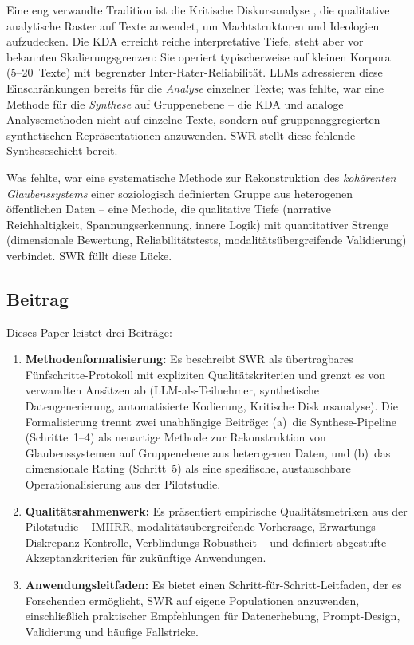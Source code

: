 \documentclass[11pt,a4paper]{article}
\begin{document}
Eine eng verwandte Tradition ist die Kritische Diskursanalyse \citep[KDA;][]{Fairclough1992, Wodak2001}, die qualitative analytische Raster auf Texte anwendet, um Machtstrukturen und Ideologien aufzudecken. Die KDA erreicht reiche interpretative Tiefe, steht aber vor bekannten Skalierungsgrenzen: Sie operiert typischerweise auf kleinen Korpora (5--20~Texte) mit begrenzter Inter-Rater-Reliabilit\"at. LLMs adressieren diese Einschr\"ankungen bereits f\"ur die \emph{Analyse} einzelner Texte; was fehlte, war eine Methode f\"ur die \emph{Synthese} auf Gruppenebene -- die KDA und analoge Analysemethoden nicht auf einzelne Texte, sondern auf gruppenaggregierten synthetischen Repr\"asentationen anzuwenden. SWR stellt diese fehlende Syntheseschicht bereit.

Was fehlte, war eine systematische Methode zur Rekonstruktion des \emph{koh\"arenten Glaubenssystems} einer soziologisch definierten Gruppe aus heterogenen \"offentlichen Daten -- eine Methode, die qualitative Tiefe (narrative Reichhaltigkeit, Spannungserkennung, innere Logik) mit quantitativer Strenge (dimensionale Bewertung, Reliabilit\"atstests, modalit\"ats\"ubergreifende Validierung) verbindet. SWR f\"ullt diese L\"ucke.


\subsection{Beitrag}
\label{sec:intro:contribution}

Dieses Paper leistet drei Beitr\"age:

\begin{enumerate}[nosep]
  \item \textbf{Methodenformalisierung:} Es beschreibt SWR als \"ubertragbares F\"unfschritte-Protokoll mit expliziten Qualit\"atskriterien und grenzt es von verwandten Ans\"atzen ab (LLM-als-Teilnehmer, synthetische Datengenerierung, automatisierte Kodierung, Kritische Diskursanalyse). Die Formalisierung trennt zwei unabh\"angige Beitr\"age: (a)~die Synthese-Pipeline (Schritte~1--4) als neuartige Methode zur Rekonstruktion von Glaubenssystemen auf Gruppenebene aus heterogenen Daten, und (b)~das dimensionale Rating (Schritt~5) als eine spezifische, austauschbare Operationalisierung aus der Pilotstudie.
  \item \textbf{Qualit\"atsrahmenwerk:} Es pr\"asentiert empirische Qualit\"atsmetriken aus der Pilotstudie -- IMIIRR, modalit\"ats\"ubergreifende Vorhersage, Erwartungs-Diskrepanz-Kontrolle, Verblindungs-Robustheit -- und definiert abgestufte Akzeptanzkriterien f\"ur zuk\"unftige Anwendungen.
  \item \textbf{Anwendungsleitfaden:} Es bietet einen Schritt-f\"ur-Schritt-Leitfaden, der es Forschenden erm\"oglicht, SWR auf eigene Populationen anzuwenden, einschlie\ss{}lich praktischer Empfehlungen f\"ur Datenerhebung, Prompt-Design, Validierung und h\"aufige Fallstricke.
\end{enumerate}
\end{document}
